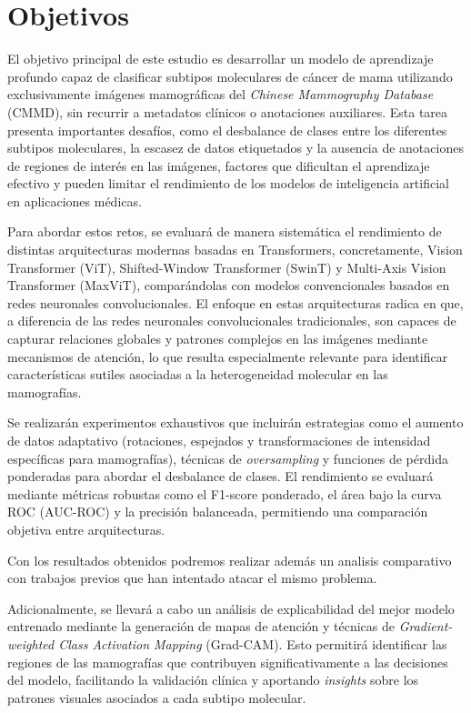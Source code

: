 \documentclass[a4paper,10pt]{book}
\begin{document}
\section{Objetivos}


El objetivo principal de este estudio es desarrollar un modelo de aprendizaje profundo capaz de clasificar subtipos moleculares de cáncer de mama utilizando exclusivamente imágenes mamográficas del \textit{Chinese Mammography Database} (CMMD), sin recurrir a metadatos clínicos o anotaciones auxiliares. Esta tarea presenta importantes desafíos, como el desbalance de clases entre los diferentes subtipos moleculares, la escasez de datos etiquetados y la ausencia de anotaciones de regiones de interés en las imágenes, factores que dificultan el aprendizaje efectivo y pueden limitar el rendimiento de los modelos de inteligencia artificial en aplicaciones médicas.

Para abordar estos retos, se evaluará de manera sistemática el rendimiento de distintas arquitecturas modernas basadas en Transformers, concretamente, Vision Transformer (ViT), Shifted-Window Transformer (SwinT) y Multi-Axis Vision Transformer (MaxViT), comparándolas con modelos convencionales basados en redes neuronales convolucionales. El enfoque en estas arquitecturas radica en que, a diferencia de las redes neuronales convolucionales tradicionales, son capaces de capturar relaciones globales y patrones complejos en las imágenes mediante mecanismos de atención, lo que resulta especialmente relevante para identificar características sutiles asociadas a la heterogeneidad molecular en las mamografías.

Se realizarán experimentos exhaustivos que incluirán estrategias como el aumento de datos adaptativo (rotaciones, espejados y transformaciones de intensidad específicas para mamografías), técnicas de \textit{oversampling} y funciones de pérdida ponderadas para abordar el desbalance de clases. El rendimiento se evaluará mediante métricas robustas como el F1-score ponderado, el área bajo la curva ROC (AUC-ROC) y la precisión balanceada, permitiendo una comparación objetiva entre arquitecturas.

Con los resultados obtenidos podremos realizar además un analisis comparativo con trabajos previos que han intentado atacar el mismo problema.

Adicionalmente, se llevará a cabo un análisis de explicabilidad del mejor modelo entrenado mediante la generación de mapas de atención y técnicas de \textit{Gradient-weighted Class Activation Mapping} (Grad-CAM). Esto permitirá identificar las regiones de las mamografías que contribuyen significativamente a las decisiones del modelo, facilitando la validación clínica y aportando \textit{insights} sobre los patrones visuales asociados a cada subtipo molecular.
\end{document}
